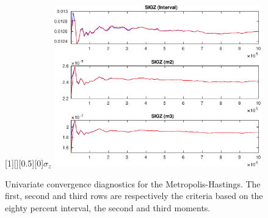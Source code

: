 \begin{figure}[H]
[1][][0.5][0]{$ {\sigma_z} $}
\centering 
\includegraphics[width=0.80\textwidth]{AnSchoModTheBuilder/Output/AnSchoModTheBuilder_udiag5}
\caption{Univariate convergence diagnostics for the Metropolis-Hastings.
The first, second and third rows are respectively the criteria based on
the eighty percent interval, the second and third moments.}\label{Fig:UnivariateDiagnostics:5}
\end{figure}

